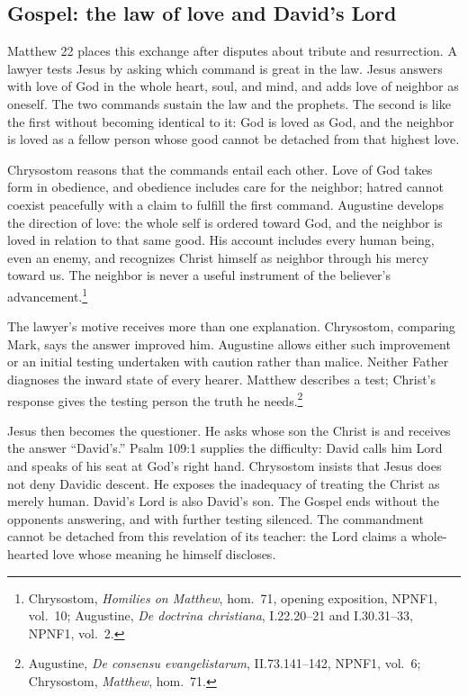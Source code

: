 \subsection{Gospel: the law of love and David's Lord}
Matthew 22 places this exchange after disputes about tribute and resurrection. A lawyer tests Jesus by asking which command is great in the law. Jesus answers with love of God in the whole heart, soul, and mind, and adds love of neighbor as oneself. The two commands sustain the law and the prophets. The second is like the first without becoming identical to it: God is loved as God, and the neighbor is loved as a fellow person whose good cannot be detached from that highest love.

Chrysostom reasons that the commands entail each other. Love of God takes form in obedience, and obedience includes care for the neighbor; hatred cannot coexist peacefully with a claim to fulfill the first command. Augustine develops the direction of love: the whole self is ordered toward God, and the neighbor is loved in relation to that same good. His account includes every human being, even an enemy, and recognizes Christ himself as neighbor through his mercy toward us. The neighbor is never a useful instrument of the believer's advancement.\footnote{Chrysostom, \textit{Homilies on Matthew}, hom.~71, opening exposition, NPNF1, vol.~10; Augustine, \textit{De doctrina christiana}, I.22.20--21 and I.30.31--33, NPNF1, vol.~2.}

The lawyer's motive receives more than one explanation. Chrysostom, comparing Mark, says the answer improved him. Augustine allows either such improvement or an initial testing undertaken with caution rather than malice. Neither Father diagnoses the inward state of every hearer. Matthew describes a test; Christ's response gives the testing person the truth he needs.\footnote{Augustine, \textit{De consensu evangelistarum}, II.73.141--142, NPNF1, vol.~6; Chrysostom, \textit{Matthew}, hom.~71.}

Jesus then becomes the questioner. He asks whose son the Christ is and receives the answer ``David's.'' Psalm 109:1 supplies the difficulty: David calls him Lord and speaks of his seat at God's right hand. Chrysostom insists that Jesus does not deny Davidic descent. He exposes the inadequacy of treating the Christ as merely human. David's Lord is also David's son. The Gospel ends without the opponents answering, and with further testing silenced. The commandment cannot be detached from this revelation of its teacher: the Lord claims a whole-hearted love whose meaning he himself discloses.

